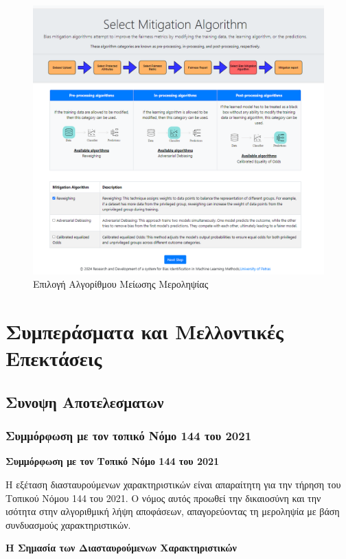 \documentclass[12pt,twoside]{article}
\newcommand{\gr}{\selectlanguage{greek}}
\begin{document}
\begin{figure}[H]
\centering
\includegraphics[width=120mm]{dutch_algorithm_selection.png}
\caption{\gr Επιλογή Αλγορίθμου Μείωσης Μεροληψίας\label{overflow}}
\end{figure}


\newpage
\section{Συμπεράσματα και Μελλοντικές Επεκτάσεις}

\subsection{Συνοψη Αποτελεσματων}

\subsubsection{Συμμόρφωση με τον τοπικό Νόμο 144 του 2021}
\textbf{Συμμόρφωση με τον Τοπικό Νόμο 144 του 2021}

Η εξέταση διασταυρούμενων χαρακτηριστικών είναι απαραίτητη για την τήρηση του Τοπικού Νόμου 144 του 2021. Ο νόμος αυτός προωθεί την δικαιοσύνη και την ισότητα στην αλγοριθμική λήψη αποφάσεων, απαγορεύοντας τη μεροληψία με βάση συνδυασμούς χαρακτηριστικών.

\textbf{Η Σημασία των Διασταυρούμενων Χαρακτηριστικών}
\end{document}
